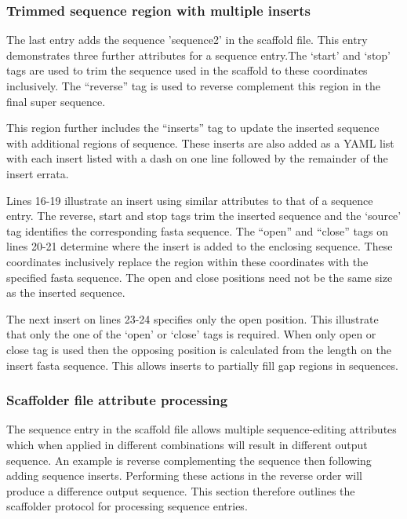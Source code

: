 \documentclass[10pt]{bmc_article}
\newenvironment{bmcformat}{\begin{raggedright}\baselineskip20pt\sloppy\setboolean{publ}{false}}{\end{raggedright}\baselineskip20pt\sloppy}
\begin{document}
\begin{bmcformat}
\subsubsection*{Trimmed sequence region with multiple inserts} %

The last entry adds the sequence 'sequence2' in the scaffold file. This entry
demonstrates three further attributes for a sequence entry.The `start' and
`stop' tags are used to trim the sequence used in the scaffold to these
coordinates inclusively. The ``reverse'' tag is used to reverse complement this
region in the final super sequence. \pb

This region further includes the ``inserts'' tag to update the inserted
sequence with additional regions of sequence. These inserts are also added as
a YAML list with each insert listed with a dash on one line followed by the
remainder of the insert errata. \pb

Lines 16-19 illustrate an insert using similar attributes to that of a sequence
entry. The reverse, start and stop tags trim the inserted sequence and the
`source' tag identifies the corresponding fasta sequence. The ``open'' and
``close'' tags on lines 20-21 determine where the insert is added to the
enclosing sequence.  These coordinates inclusively replace the region within
these coordinates with the specified fasta sequence. The open and close
positions need not be the same size as the inserted sequence. \pb

The next insert on lines 23-24 specifies only the open position. This
illustrate that only the one of the `open' or `close' tags is required.  When
only open or close tag is used then the opposing position is calculated from
the length on the insert fasta sequence. This allows inserts to partially fill
gap regions in sequences. \pb

\subsubsection*{Scaffolder file attribute processing} %

The sequence entry in the scaffold file allows multiple sequence-editing
attributes which when applied in different combinations will result in
different output sequence. An example is reverse complementing the sequence
then following adding sequence inserts. Performing these actions in the reverse
order will produce a difference output sequence. This section therefore
outlines the scaffolder protocol for processing sequence entries. \pb


\end{bmcformat}
\end{document}
